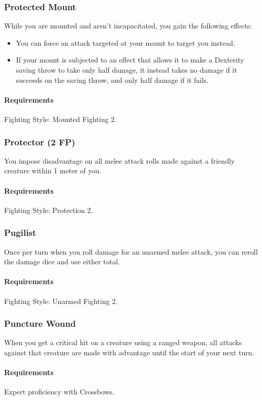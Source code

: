 \subsubsection{Protected Mount} \label{feat::protectedmount}
    While you are mounted and aren't incapacitated, you gain the following effects:
    \begin{itemize}
        \item You can force an attack targeted at your mount to target you instead.
        \item If your mount is subjected to an effect that allows it to make a Dexterity saving throw to take only half damage, it instead takes no damage if it succeeds on the saving throw, and only half damage if it fails.
    \end{itemize}
    \paragraph{Requirements} Fighting Style: Mounted Fighting 2.
\subsubsection{Protector (2 FP)} \label{feat::protector}
    You impose disadvantage on all melee attack rolls made against a friendly creature within 1 meter of you.
    \paragraph{Requirements} Fighting Style: Protection 2.
\subsubsection{Pugilist} \label{feat::pugilist}
    Once per turn when you roll damage for an unarmed melee attack, you can reroll the damage dice and use either total.
    \paragraph{Requirements} Fighting Style: Unarmed Fighting 2.
\subsubsection{Puncture Wound} \label{feat::puncturewound}
    When you get a critical hit on a creature using a ranged weapon, all attacks against that creature are made with advantage until the start of your next turn.
    \paragraph{Requirements} Expert proficiency with Crossbows.
